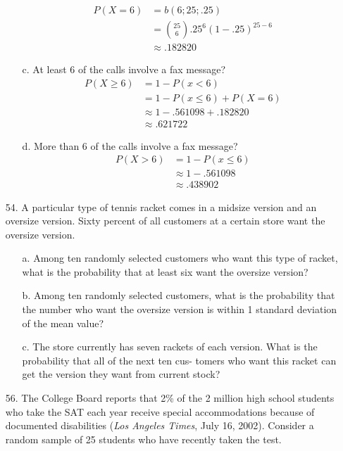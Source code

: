 \documentclass[letterpaper,12pt]{article}
\newcommand{\bp}[3]{%
  \binom{#2}{#1}#3^#1(1 - #3)^{#2 - #1}%
}
\begin{document}
\begin{enumerate}
\begin{enumerate}
        \begin{align*}
          P(X = 6) &= b(6; 25; .25) \\
          &= \bp{6}{25}{.25} \\
          &\approx .182820
        \end{align*}
      \item[c.]
        At least 6 of the calls involve a fax message?
        \begin{align*}
          P(X \ge 6) &= 1 - P(x < 6) \\
          &= 1 - P(x \le 6) + P(X = 6) \\
          &\approx 1 - .561098 + .182820 \\
          &\approx .621722
        \end{align*}
      \item[d.]
        More than 6 of the calls involve a fax message?
        \begin{align*}
          P(X > 6) &= 1 - P(x \le 6) \\
          &\approx 1 - .561098 \\
          &\approx  .438902
        \end{align*}
    \end{enumerate}
  \item[54.]
    A particular type of tennis racket comes in a midsize version and an oversize version. Sixty percent of all customers at a certain store want the oversize version.
    \begin{enumerate}
      \item[a.]
        Among ten randomly selected customers who want this type of racket, what is the probability that at least six want the oversize version?
      \item[b.]
        Among ten randomly selected customers, what is the probability that the number who want the oversize version is within 1 standard deviation of the mean value?
      \item[c.]
        The store currently has seven rackets of each version. What is the probability that all of the next ten cus- tomers who want this racket can get the version they want from current stock?
    \end{enumerate}
  \item[56.]
    The College Board reports that 2\% of the 2 million high school students who take the SAT each year receive special accommodations because of documented disabilities (\textit{Los Angeles Times}, July 16, 2002). Consider a random sample of 25 students who have recently taken the test.

\end{enumerate}
\end{document}
